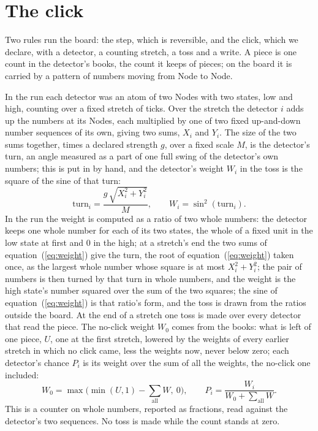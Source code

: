 \documentclass[pdflatex,sn-mathphys-num]{sn-jnl}
\begin{document}
\section{The click}\label{sec:click}

Two rules run the board: the step, which is reversible, and the click, which we declare, with a detector, a counting stretch, a toss and a write. A piece is one count in the detector's books, the count it keeps of pieces; on the board it is carried by a pattern of numbers moving from Node to Node. 

In the run each detector was an atom of two Nodes with two states, low and high, counting over a fixed stretch of ticks. Over the stretch the detector $i$ adds up the numbers at its Nodes, each multiplied by one of two fixed up-and-down number sequences of its own, giving two sums, $X_i$ and $Y_i$. The size of the two sums together, times a declared strength $g$, over a fixed scale $M$, is the detector's turn, an angle measured as a part of one full swing of the detector's own numbers; this is put in by hand, and the detector's weight $W_i$ in the toss is the square of the sine of that turn:
\begin{equation}\label{eq:weight}
\mathrm{turn}_i = \frac{g\,\sqrt{X_i^2 + Y_i^2}}{M}, \qquad W_i = \sin^2(\mathrm{turn}_i).
\end{equation}
In the run the weight is computed as a ratio of two whole numbers: the detector keeps one whole number for each of its two states, the whole of a fixed unit in the low state at first and 0 in the high; at a stretch's end the two sums of equation~(\ref{eq:weight}) give the turn, the root of equation~(\ref{eq:weight}) taken once, as the largest whole number whose square is at most $X_i^2 + Y_i^2$; the pair of numbers is then turned by that turn in whole numbers, and the weight is the high state's number squared over the sum of the two squares; the sine of equation~(\ref{eq:weight}) is that ratio's form, and the toss is drawn from the ratios outside the board. At the end of a stretch one toss is made over every detector that read the piece. The no-click weight $W_0$ comes from the books: what is left of one piece, $U$, one at the first stretch, lowered by the weights of every earlier stretch in which no click came, less the weights now, never below zero; each detector's chance $P_i$ is its weight over the sum of all the weights, the no-click one included:
\begin{equation}\label{eq:chance}
W_0 = \max\Big(\min(U, 1) - \sum_{\text{all}} W,\ 0\Big), \qquad P_i = \frac{W_i}{W_0 + \sum_{\text{all}} W}.
\end{equation}
This is a counter on whole numbers, reported as fractions, read against the detector's two sequences. No toss is made while the count stands at zero.
\end{document}
